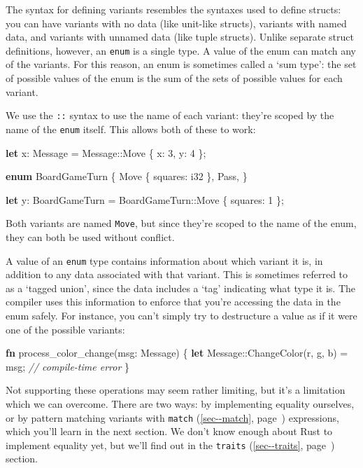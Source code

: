 \documentclass[a4paper,]{book}
\renewcommand*{\hyperlink}[2]{%
 #2 (\autoref{#1}, page~\pageref{#1})}
\newenvironment{Shaded}{\begin{snugshade}}{\end{snugshade}}
\newcommand{\KeywordTok}[1]{\textcolor[rgb]{0.13,0.29,0.53}{\textbf{{#1}}}}
\newcommand{\DataTypeTok}[1]{\textcolor[rgb]{0.13,0.29,0.53}{{#1}}}
\newcommand{\DecValTok}[1]{\textcolor[rgb]{0.00,0.00,0.81}{{#1}}}
\newcommand{\CommentTok}[1]{\textcolor[rgb]{0.56,0.35,0.01}{\textit{{#1}}}}
\newcommand{\NormalTok}[1]{{#1}}
\begin{document}
The syntax for defining variants resembles the syntaxes used to define
structs: you can have variants with no data (like unit-like structs),
variants with named data, and variants with unnamed data (like tuple
structs). Unlike separate struct definitions, however, an \texttt{enum}
is a single type. A value of the enum can match any of the variants. For
this reason, an enum is sometimes called a `sum type': the set of
possible values of the enum is the sum of the sets of possible values
for each variant.

We use the \texttt{::} syntax to use the name of each variant: they're
scoped by the name of the \texttt{enum} itself. This allows both of
these to work:

\begin{Shaded}
\begin{Highlighting}[]
\KeywordTok{let} \NormalTok{x: Message = Message::Move \{ x: }\DecValTok{3}\NormalTok{, y: }\DecValTok{4} \NormalTok{\};}

\KeywordTok{enum} \NormalTok{BoardGameTurn \{}
    \NormalTok{Move \{ squares: }\DataTypeTok{i32} \NormalTok{\},}
    \NormalTok{Pass,}
\NormalTok{\}}

\KeywordTok{let} \NormalTok{y: BoardGameTurn = BoardGameTurn::Move \{ squares: }\DecValTok{1} \NormalTok{\};}
\end{Highlighting}
\end{Shaded}

Both variants are named \texttt{Move}, but since they're scoped to the
name of the enum, they can both be used without conflict.

A value of an \texttt{enum} type contains information about which
variant it is, in addition to any data associated with that variant.
This is sometimes referred to as a `tagged union', since the data
includes a `tag' indicating what type it is. The compiler uses this
information to enforce that you're accessing the data in the enum
safely. For instance, you can't simply try to destructure a value as if
it were one of the possible variants:

\begin{Shaded}
\begin{Highlighting}[]
\KeywordTok{fn} \NormalTok{process_color_change(msg: Message) \{}
    \KeywordTok{let} \NormalTok{Message::ChangeColor(r, g, b) = msg; }\CommentTok{// compile-time error}
\NormalTok{\}}
\end{Highlighting}
\end{Shaded}

Not supporting these operations may seem rather limiting, but it's a
limitation which we can overcome. There are two ways: by implementing
equality ourselves, or by pattern matching variants with
\protect\hyperlink{sec--match}{\texttt{match}} expressions, which you'll
learn in the next section. We don't know enough about Rust to implement
equality yet, but we'll find out in the
\protect\hyperlink{sec--traits}{\texttt{traits}} section.
\end{document}
